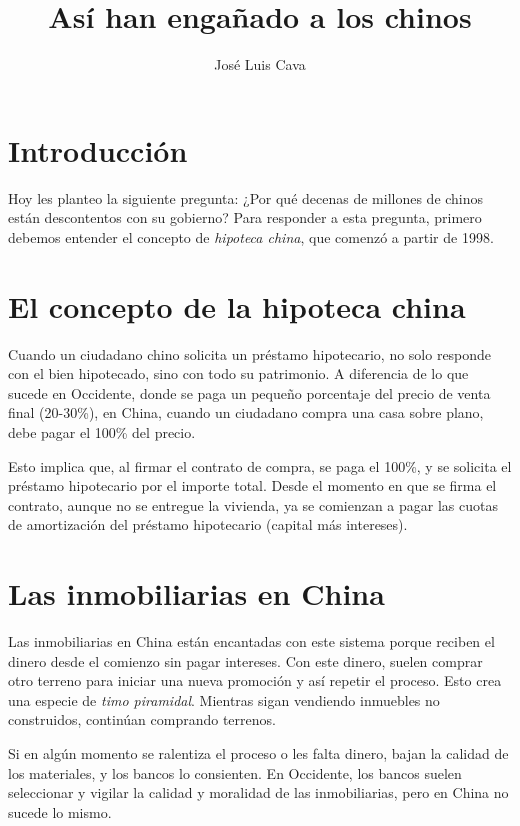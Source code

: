 \documentclass{article}
\title{Así han engañado a los chinos}
\author{José Luis Cava}
\date{}
\begin{document}
\maketitle

\section*{Introducción}

Hoy les planteo la siguiente pregunta: ¿Por qué decenas de millones de chinos están descontentos con su gobierno? Para responder a esta pregunta, primero debemos entender el concepto de \textit{hipoteca china}, que comenzó a partir de 1998.

\section*{El concepto de la hipoteca china}

Cuando un ciudadano chino solicita un préstamo hipotecario, no solo responde con el bien hipotecado, sino con todo su patrimonio. A diferencia de lo que sucede en Occidente, donde se paga un pequeño porcentaje del precio de venta final (20-30\%), en China, cuando un ciudadano compra una casa sobre plano, debe pagar el 100\% del precio.

Esto implica que, al firmar el contrato de compra, se paga el 100\%, y se solicita el préstamo hipotecario por el importe total. Desde el momento en que se firma el contrato, aunque no se entregue la vivienda, ya se comienzan a pagar las cuotas de amortización del préstamo hipotecario (capital más intereses).

\section*{Las inmobiliarias en China}

Las inmobiliarias en China están encantadas con este sistema porque reciben el dinero desde el comienzo sin pagar intereses. Con este dinero, suelen comprar otro terreno para iniciar una nueva promoción y así repetir el proceso. Esto crea una especie de \textit{timo piramidal}. Mientras sigan vendiendo inmuebles no construidos, continúan comprando terrenos.

Si en algún momento se ralentiza el proceso o les falta dinero, bajan la calidad de los materiales, y los bancos lo consienten. En Occidente, los bancos suelen seleccionar y vigilar la calidad y moralidad de las inmobiliarias, pero en China no sucede lo mismo.
\end{document}
